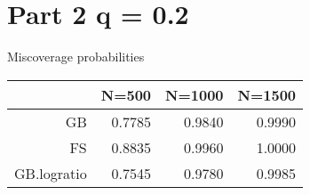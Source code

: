 \section*{Part 2 q = 0.2}


Miscoverage probabilities

\begin{tabular}{rrrr}
  \hline
 & N=500 & N=1000 & N=1500 \\ 
  \hline
GB & 0.7785 & 0.9840 & 0.9990 \\ 
  FS & 0.8835 & 0.9960 & 1.0000 \\ 
  GB.logratio & 0.7545 & 0.9780 & 0.9985 \\ 
   \hline
\end{tabular}
\vspace{0.2in}
